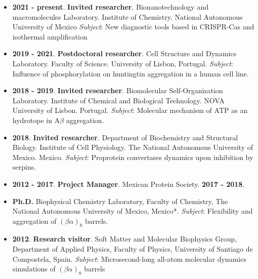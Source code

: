 \documentclass[letterpaper,11pt]{article}
\begin{document}
\begin{itemize}

\item \textbf{2021 - present}. \textbf{Invited researcher}. Bionanotechnology and macromolecules Laboratory. Institute of Chemistry. National Autonomous University of Mexico   
  \textit{Subject}: New diagnostic tools based in CRISPR-Cas and isothermal amplification 

\item \textbf{2019 - 2021}. \textbf{Postdoctoral researcher}. Cell Structure and Dynamics Laboratory. Faculty of Science. University of Lisbon, Portugal.   %
  \textit{Subject}: Influence of phosphorylation on huntingtin aggregation in a human cell line.%
  
\item \textbf{2018 - 2019}. \textbf{Invited researcher}. Biomolecular Self-Organization Laboratory. Institute of Chemical and Biological Technology. NOVA University of Lisbon. Portugal. %
 \textit{Subject}: Molecular mechanism of ATP as an hydrotope in A$\beta$ aggregation.
 
\item \textbf{2018}. \textbf{Invited researcher}. Department of Biochemistry and Structural Biology. Institute of Cell Physiology. The National Autonomous University of Mexico. Mexico.  %
  \textit{Subject}: Proprotein convertases dynamics upon inhibition by serpins.
  
 \item \textbf{2012 - 2017}. \textbf{Project Manager}. Mexican Protein Society. \textbf{2017 - 2018}.  %
\item \textbf{Ph.D.} Biophysical Chemistry Laboratory, Faculty of Chemistry,  The National Autonomous University of Mexico, Mexico*.   %
  \textit{Subject}: Flexibility and aggregation of $(\beta\alpha)_8$ barrels.
  
\item \textbf{2012}. \textbf{Research visitor}. Soft Matter and Molecular Biophysics Group, Department of Applied Physics, Faculty of Physics, University of Santiago de Compostela, Spain.  %
  \textit{Subject}: Microsecond-long all-atom molecular dynamics simulations of $(\beta\alpha)_8$ barrels 
  

\end{itemize}
\end{document}
